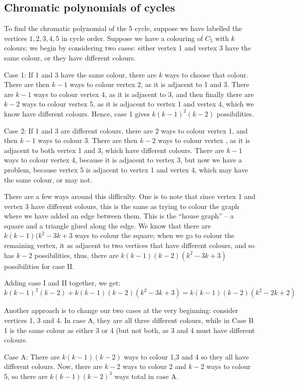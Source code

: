 \documentclass{amsart}
\begin{document}
\subsection{Chromatic polynomials of cycles}

To find the chromatic polynomial of the 5 cycle, suppose we have labelled the vertices $1,2,3,4,5$ in cycle order.  Suppose we have a colouring of $C_5$ with $k$ colours; we begin by considering two cases: either vertex 1 and vertex 3 have the same colour, or they have different colours.

Case 1: If 1 and 3 have the same colour, there are $k$ ways to choose that colour. There are then $k-1$ ways to colour vertex 2, as it is adjacent to 1 and 3.  There are $k-1$ ways to colour vertex 4, as it is adjacent to 3, and then finally there are $k-2$ ways to colour vertex 5, as it is adjacent to vertex 1 and vertex 4, which we know have different colours.  Hence, case 1 gives $k(k-1)^2(k-2)$ possibilities.

Case 2: If 1 and 3 are different colours, there are $2$ ways to colour vertex 1, and then $k-1$ ways to colour 3.  There are then $k-2$ ways to colour vertex , as it is adjacent to both vertex 1 and 3, which have different colours.  There are $k-1$ ways to colour vertex 4, because it is adjacent to vertex 3, but now we have a problem, because vertex 5 is adjacent to vertex 1 and vertex 4, which may have the same colour, or may not.

There are a few ways around this difficulty.  One is to note that since vertex 1 and vertex 3 have different colours, this is the same as trying to colour the graph where we have added an edge between them.  This is the ``house graph'' -- a square and a triangle glued along the edge.  We know that there are $k(k-1)(k^2-3k+3$ ways to colour the square; when we go to colour the remaining vertex, it as adjacent to two vertices that have different colours, and so has $k-2$ possibilities, thus, there are $k(k-1)(k-2)(k^2-3k+3)$ possibilities for case II.

Adding case I and II together, we get:
$$k(k-1)^2(k-2)+k(k-1)(k-2)(k^2-3k+3)=k(k-1)(k-2)(k^2-2k+2)$$

Another approach is to change our two cases at the very beginning: consider vertices 1, 3 and 4.  In case A, they are all three different colours, while in Case B 1 is the same colour as either 3 or 4 (but not both, as 3 and 4 must have different colours.

Case A: There are $k(k-1)(k-2)$ ways to colour 1,3 and 4 so they all have different colours.  Now, there are $k-2$ ways to colour 2 and $k-2$ ways to colour 5, so there are $k(k-1)(k-2)^3$ ways total in case A.
\end{document}
